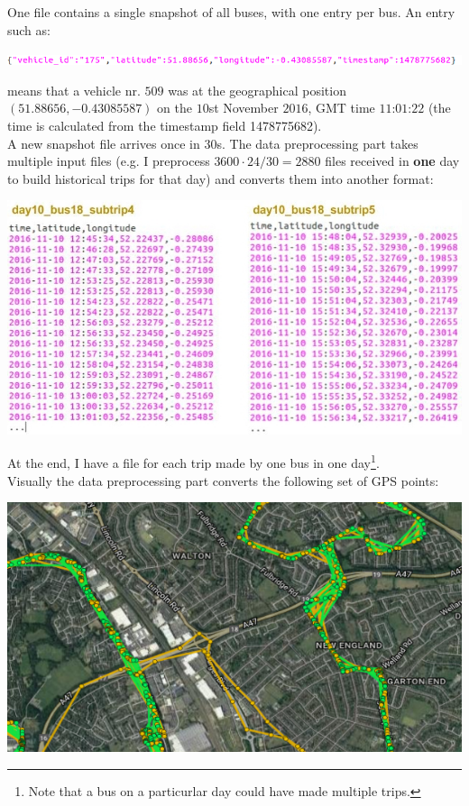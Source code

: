 \documentclass[12pt,a4paper,oneside,openright]{report}
\begin{document}
One file contains a single snapshot of all buses, 
with one entry per bus. An entry such as:

\includegraphics[width=\textwidth]{figs/entry.png}

means that a vehicle nr. $509$ was at the geographical position
$(51.88656, -0.43085587)$ on the $10$st November $2016$, GMT time
$11$:$01$:$22$ (the time is calculated from the timestamp field 1478775682). \\

A new snapshot file arrives once in $30$s. The data preprocessing part
takes multiple input files (e.g. I preprocess $3600 \cdot 24 / 30 = 2880$ files
received in \textbf{one} day to build historical trips for that day) and converts them
into another format:

\includegraphics[width=\textwidth]{figs/converted_format.jpg}

At the end, I have a file for each trip made by one bus in one
day\footnote{Note that a bus on a particurlar day could have made
multiple trips.}. \\

Visually the data preprocessing part converts the following set of GPS points:

\includegraphics[width=\textwidth]{figs/unprocessed.png} \\
\end{document}
